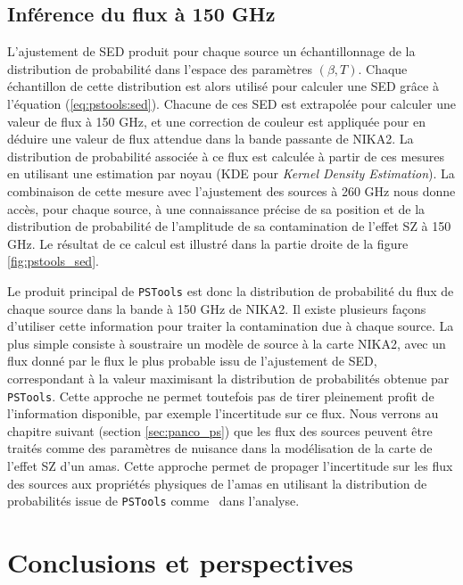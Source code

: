 \subsection{Inférence du flux à 150 GHz}

L'ajustement de SED produit pour chaque source un échantillonnage de la distribution de probabilité dans l'espace des paramètres $(\beta, T)$.
Chaque échantillon de cette distribution est alors utilisé pour calculer une SED grâce à l'équation (\ref{eq:pstools:sed}).
Chacune de ces SED est extrapolée pour calculer une valeur de flux à 150 GHz, et une correction de couleur est appliquée pour en déduire une valeur de flux attendue dans la bande passante de NIKA2.
La distribution de probabilité associée à ce flux est calculée à partir de ces mesures en utilisant une estimation par noyau (KDE pour \textit{Kernel Density Estimation}).
La combinaison de cette mesure avec l'ajustement des sources à 260 GHz nous donne accès, pour chaque source, à une connaissance précise de sa position et de la distribution de probabilité de l'amplitude de sa contamination de l'effet SZ à 150 GHz.
Le résultat de ce calcul est illustré dans la partie droite de la figure \ref{fig:pstools_sed}.

Le produit principal de \texttt{PSTools} est donc la distribution de probabilité du flux de chaque source dans la bande à 150 GHz de NIKA2.
Il existe plusieurs façons d'utiliser cette information pour traiter la contamination due à chaque source.
La plus simple consiste à soustraire un modèle de source à la carte NIKA2, avec un flux donné par le flux le plus probable issu de l'ajustement de SED, correspondant à la valeur maximisant la distribution de probabilités obtenue par \texttt{PSTools}.
Cette approche ne permet toutefois pas de tirer pleinement profit de l'information disponible, par exemple l'incertitude sur ce flux.
Nous verrons au chapitre suivant (section \ref{sec:panco_ps}) que les flux des sources peuvent être traités comme des paramètres de nuisance dans la modélisation de la carte de l'effet SZ d'un amas.
Cette approche permet de propager l'incertitude sur les flux des sources aux propriétés physiques de l'amas en utilisant la distribution de probabilités issue de \texttt{PSTools} comme \prior\ dans l'analyse.

\section{Conclusions et perspectives}

